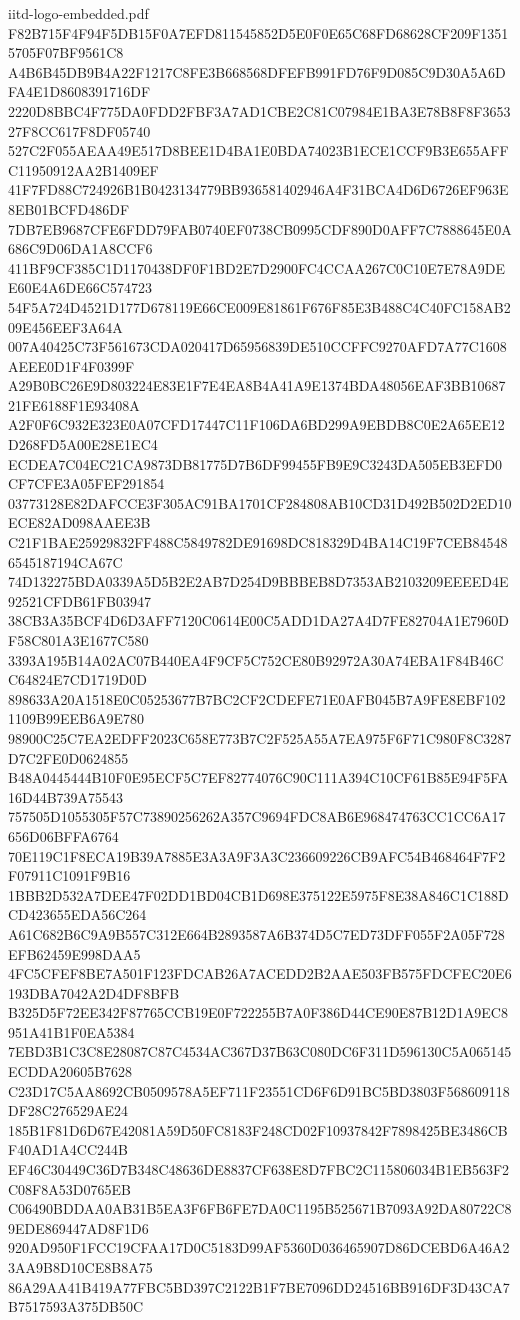 \begin{filecontents*}[overwrite]{iitd-logo-embedded.pdf}
F82B715F4F94F5DB15F0A7EFD811545852D5E0F0E65C68FD68628CF209F13515705F07BF9561C8
A4B6B45DB9B4A22F1217C8FE3B668568DFEFB991FD76F9D085C9D30A5A6DFA4E1D8608391716DF
2220D8BBC4F775DA0FDD2FBF3A7AD1CBE2C81C07984E1BA3E78B8F8F365327F8CC617F8DF05740
527C2F055AEAA49E517D8BEE1D4BA1E0BDA74023B1ECE1CCF9B3E655AFFC11950912AA2B1409EF
41F7FD88C724926B1B0423134779BB936581402946A4F31BCA4D6D6726EF963E8EB01BCFD486DF
7DB7EB9687CFE6FDD79FAB0740EF0738CB0995CDF890D0AFF7C7888645E0A686C9D06DA1A8CCF6
411BF9CF385C1D1170438DF0F1BD2E7D2900FC4CCAA267C0C10E7E78A9DEE60E4A6DE66C574723
54F5A724D4521D177D678119E66CE009E81861F676F85E3B488C4C40FC158AB209E456EEF3A64A
007A40425C73F561673CDA020417D65956839DE510CCFFC9270AFD7A77C1608AEEE0D1F4F0399F
A29B0BC26E9D803224E83E1F7E4EA8B4A41A9E1374BDA48056EAF3BB1068721FE6188F1E93408A
A2F0F6C932E323E0A07CFD17447C11F106DA6BD299A9EBDB8C0E2A65EE12D268FD5A00E28E1EC4
ECDEA7C04EC21CA9873DB81775D7B6DF99455FB9E9C3243DA505EB3EFD0CF7CFE3A05FEF291854
03773128E82DAFCCE3F305AC91BA1701CF284808AB10CD31D492B502D2ED10ECE82AD098AAEE3B
C21F1BAE25929832FF488C5849782DE91698DC818329D4BA14C19F7CEB845486545187194CA67C
74D132275BDA0339A5D5B2E2AB7D254D9BBBEB8D7353AB2103209EEEED4E92521CFDB61FB03947
38CB3A35BCF4D6D3AFF7120C0614E00C5ADD1DA27A4D7FE82704A1E7960DF58C801A3E1677C580
3393A195B14A02AC07B440EA4F9CF5C752CE80B92972A30A74EBA1F84B46CC64824E7CD1719D0D
898633A20A1518E0C05253677B7BC2CF2CDEFE71E0AFB045B7A9FE8EBF1021109B99EEB6A9E780
98900C25C7EA2EDFF2023C658E773B7C2F525A55A7EA975F6F71C980F8C3287D7C2FE0D0624855
B48A0445444B10F0E95ECF5C7EF82774076C90C111A394C10CF61B85E94F5FA16D44B739A75543
757505D1055305F57C73890256262A357C9694FDC8AB6E968474763CC1CC6A17656D06BFFA6764
70E119C1F8ECA19B39A7885E3A3A9F3A3C236609226CB9AFC54B468464F7F2F07911C1091F9B16
1BBB2D532A7DEE47F02DD1BD04CB1D698E375122E5975F8E38A846C1C188DCD423655EDA56C264
A61C682B6C9A9B557C312E664B2893587A6B374D5C7ED73DFF055F2A05F728EFB62459E998DAA5
4FC5CFEF8BE7A501F123FDCAB26A7ACEDD2B2AAE503FB575FDCFEC20E6193DBA7042A2D4DF8BFB
B325D5F72EE342F87765CCB19E0F722255B7A0F386D44CE90E87B12D1A9EC8951A41B1F0EA5384
7EBD3B1C3C8E28087C87C4534AC367D37B63C080DC6F311D596130C5A065145ECDDA20605B7628
C23D17C5AA8692CB0509578A5EF711F23551CD6F6D91BC5BD3803F568609118DF28C276529AE24
185B1F81D6D67E42081A59D50FC8183F248CD02F10937842F7898425BE3486CBF40AD1A4CC244B
EF46C30449C36D7B348C48636DE8837CF638E8D7FBC2C115806034B1EB563F2C08F8A53D0765EB
C06490BDDAA0AB31B5EA3F6FB6FE7DA0C1195B525671B7093A92DA80722C89EDE869447AD8F1D6
920AD950F1FCC19CFAA17D0C5183D99AF5360D036465907D86DCEBD6A46A23AA9B8D10CE8B8A75
86A29AA41B419A77FBC5BD397C2122B1F7BE7096DD24516BB916DF3D43CA7B7517593A375DB50C

\end{filecontents*}
